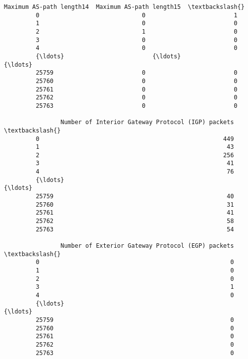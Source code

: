 \documentclass[11pt]{article}
\begin{document}
\begin{Verbatim}[commandchars=\\\{\}]
                Maximum AS-path length14  Maximum AS-path length15  \textbackslash{}
         0                             0                         1   
         1                             0                         0   
         2                             1                         0   
         3                             0                         0   
         4                             0                         0   
         {\ldots}                         {\ldots}                       {\ldots}   
         25759                         0                         0   
         25760                         0                         0   
         25761                         0                         0   
         25762                         0                         0   
         25763                         0                         0   
         
                Number of Interior Gateway Protocol (IGP) packets  \textbackslash{}
         0                                                    449   
         1                                                     43   
         2                                                    256   
         3                                                     41   
         4                                                     76   
         {\ldots}                                                  {\ldots}   
         25759                                                 40   
         25760                                                 31   
         25761                                                 41   
         25762                                                 58   
         25763                                                 54   
         
                Number of Exterior Gateway Protocol (EGP) packets  \textbackslash{}
         0                                                      0   
         1                                                      0   
         2                                                      0   
         3                                                      1   
         4                                                      0   
         {\ldots}                                                  {\ldots}   
         25759                                                  0   
         25760                                                  0   
         25761                                                  0   
         25762                                                  0   
         25763                                                  0   
         

\end{Verbatim}
\end{document}
